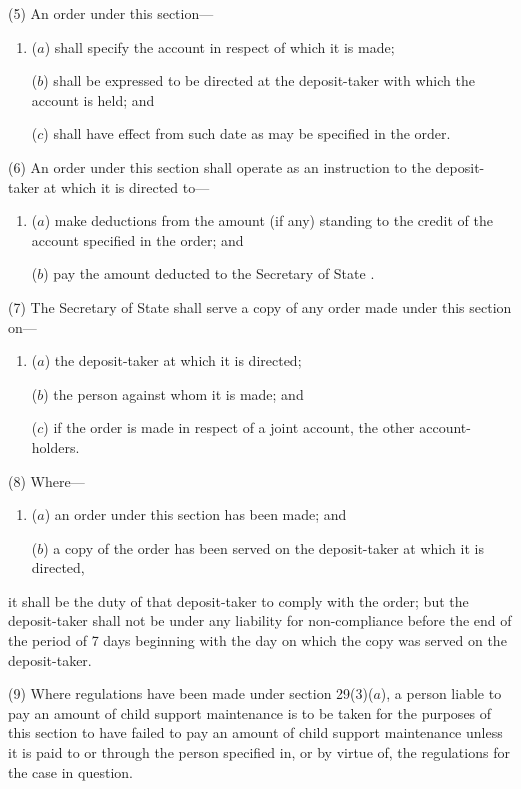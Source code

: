 \documentclass[12pt,a4paper]{article}
\begin{document}
(5) An order under this section---
\begin{enumerate}\item[]
($a$) shall specify the account in respect of which it is made;

($b$) shall be expressed to be directed at the deposit-taker with which the account is held; and

($c$) shall have effect from such date as may be specified in the order.
\end{enumerate}

(6) An order under this section shall operate as an instruction to the deposit-taker at which it is directed to---
\begin{enumerate}\item[]
($a$) make deductions from the amount (if any) standing to the credit of the account specified in the order; and

($b$) pay the amount deducted to the 
Secretary of State%
.
\end{enumerate}

(7) The 
Secretary of State  %
shall serve a copy of any order made under this section on---
\begin{enumerate}\item[]
($a$) the deposit-taker at which it is directed;

($b$) the person against whom it is made; and

($c$) if the order is made in respect of a joint account, the other account-holders.
\end{enumerate}

(8)
Where---
\begin{enumerate}\item[]
($a$)
an order under this section has been made; and

($b$)
a copy of the order has been served on the deposit-taker at which it is directed, 
\end{enumerate}
it shall be the duty of that deposit-taker to comply with the order; but the deposit-taker shall not be under any liability for non-compliance before the end of the period of 7 days beginning with the day on which the copy was served on the deposit-taker.

\begin{sloppypar}
(9)
Where regulations have been made under section 29(3)($a$), a person liable to pay an amount of child support maintenance is to be taken for the purposes of this section to have failed to pay an amount of child support maintenance unless it is paid to or through the person specified in, or by virtue of, the regulations for the case in question.
\end{sloppypar}
\end{document}
